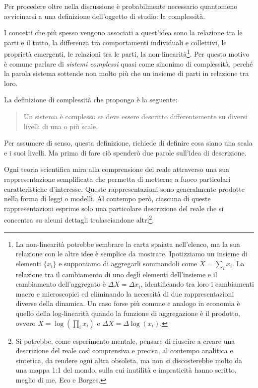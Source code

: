 \documentclass[a4paper, headings=standardclasses]{scrartcl}
\begin{document}
Per procedere oltre nella discussione è probabilmente necessario quantomeno avvicinarsi a una definizione dell'oggetto di studio: la complessità.

I concetti che più spesso vengono associati a quest'idea sono la relazione tra le parti e il tutto, la differenza tra comportamenti individuali e collettivi, le proprietà emergenti, le relazioni tra le parti, la non-linearità\footnote{La non-linearità potrebbe sembrare la carta spaiata nell'elenco, ma la sua relazione con le altre idee è semplice da mostrare. Ipotizziamo un insieme di elementi $\{x_i\}$ e supponiamo di aggregarli sommandoli come $X=\sum_i x_i$. La relazione tra il cambiamento di uno degli elementi dell'insieme e il cambiamento dell'aggregato è $\Delta X=\Delta x_i$, identificando tra loro i cambiamenti macro e microscopici ed eliminando la necessità di due rappresentazioni diverse della dinamica. Un caso forse più comune e analogo in economia è quello della log-linearità quando la funzione di aggregazione è il prodotto, ovvero $X = \log(\prod_i x_i)$ e $\Delta X=\Delta\log(x_i)$.}. Per questo motivo è comune parlare di \textit{sistemi complessi} quasi come sinonimo di complessità, perché la parola sistema sottende non molto più che un insieme di parti in relazione tra loro.

La definizione di complessità che propongo è la seguente:
\begin{quote}
	Un sistema è complesso se deve essere descritto differentemente su diversi livelli di una o più scale.
\end{quote}

Per assumere di senso, questa definizione, richiede di definire cosa siano una scala e i suoi livelli. Ma prima di fare ciò spenderò due parole sull'idea di descrizione.

Ogni teoria scientifica mira alla comprensione del reale attraverso una sua rappresentazione semplificata che permetta di metterne a fuoco particolari caratteristiche d'interesse. Queste rappresentazioni sono generalmente prodotte nella forma di leggi o modelli.
Al contempo però, ciascuna di queste rappresentazioni esprime solo una particolare descrizione del reale che si concentra su alcuni dettagli tralasciandone altri\footnote{Si potrebbe, come esperimento mentale, pensare di riuscire a creare una descrizione del reale così comprensiva e precisa, al contempo analitica e sintetica, da rendere ogni altra obsoleta, ma non si discosterebbe molto da una mappa 1:1 del mondo, sulla cui inutilità e impraticità hanno scritto, meglio di me, Eco e Borges.}.
\end{document}
